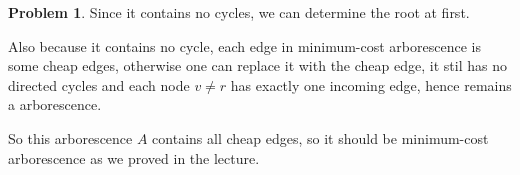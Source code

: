 \documentclass[a4paper]{article}
\theoremstyle{definition}
\newtheorem{problem}{Problem}
\theoremstyle{plain}
\numberwithin{equation}{problem}
\begin{document}
\begin{problem}
  Since it contains no cycles, we can determine the root at first.

  Also because it contains no cycle, each edge in  minimum-cost arborescence is some cheap edges, otherwise one can replace  it with the cheap edge, it stil has no directed cycles and each node  $ v\neq r$ has exactly one incoming edge, hence remains a arborescence.

  So this arborescence $ A $ contains all cheap edges, so it should be minimum-cost arborescence as we proved in the lecture. 
\end{problem}
\end{document}
